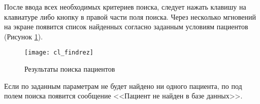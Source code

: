 После ввода всех необходимых критериев поиска, следует нажать клавишу  на клавиатуре либо кнопку  в правой части поля поиска. Через несколько мгновений на экране появится список найденных согласно заданным условиям пациентов (Рисунок \ref{img_cl_findrez}). 
 
\begin{figure}[ht]\centering
 \texttt{[image: cl\_findrez]}
 \caption{Результаты поиска пациентов}
 \label{img_cl_findrez}
\end{figure} 

Если по заданным параметрам не будет найдено ни одного пациента, по под полем поиска появится сообщение <<Пациент не найден в базе данных>>.

